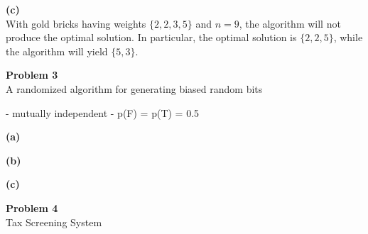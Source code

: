 \documentclass[12pt,article]{article}
\newenvironment{problem}[2][Problem]
    { \begin{mdframed}[backgroundcolor=gray!20] \textbf{#1 #2} \\}
    {  \end{mdframed}}
\begin{document}



\textbf{(c)} \\
With gold bricks having weights $\{2,2,3,5\}$ and $n = 9$, the algorithm will not produce the optimal solution. In particular, the optimal solution is $\{2,2,5\}$, while the algorithm will yield $\{5,3\}$.

\newpage
\begin{problem}{3} 
A randomized algorithm for generating biased random bits
\end{problem}
- mutually independent
- p(F) = p(T) = 0.5



\textbf{(a)}

\textbf{(b)}

\textbf{(c)}

\newpage
\begin{problem}{4} 
Tax Screening System
\end{problem}



\end{document}
